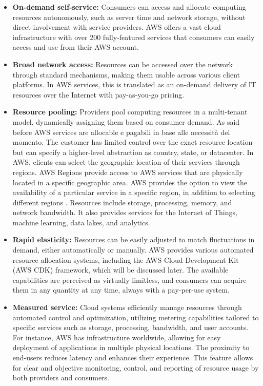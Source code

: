 \begin{itemize}
    \item \textbf{On-demand self-service:} Consumers can access and allocate computing resources autonomously, such as server time and network storage, without direct involvement with service providers. AWS offers a vast cloud infrastructure with over 200 fully-featured services that consumers can easily access and use from their AWS account.
    \item \textbf{Broad network access:} Resources can be accessed over the network through standard mechanisms, making them usable across various client platforms. In AWS services, this is translated as an on-demand delivery of IT resources over the Internet with pay-as-you-go pricing. 
    \item \textbf{Resource pooling:} Providers pool computing resources in a multi-tenant model, dynamically assigning them based on consumer demand. As said before AWS services are allocable e pagabili in base alle necessità del momento. The customer has limited control over the exact resource location but can specify a higher-level abstraction as country, state, or datacenter. In AWS, clients can select the geographic location of their services through regions. AWS Regions provide access to AWS services that are physically located in a specific geographic area. AWS provides the option to view the availability of a particular service in a specific region, in addition to selecting different regions \cite{AWSRegions}. Resources include storage, processing, memory, and network bandwidth. It also provides services for the Internet of Things, machine learning, data lakes, and analytics.
    \item \textbf{Rapid elasticity:} Resources can be easily adjusted to match fluctuations in demand, either automatically or manually. AWS provides various automated resource allocation systems, including the AWS Cloud Development Kit (AWS CDK) framework, which will be discussed later. The available capabilities are perceived as virtually limitless, and consumers can acquire them in any quantity at any time, always with a pay-per-use system.
    \item \textbf{Measured service:} Cloud systems efficiently manage resources through automated control and optimization, utilizing metering capabilities tailored to specific services such as storage, processing, bandwidth, and user accounts. For instance, AWS has infrastructure worldwide, allowing for easy deployment of applications in multiple physical locations. The proximity to end-users reduces latency and enhances their experience. This feature allows for clear and objective monitoring, control, and reporting of resource usage by both providers and consumers.
\end{itemize}

